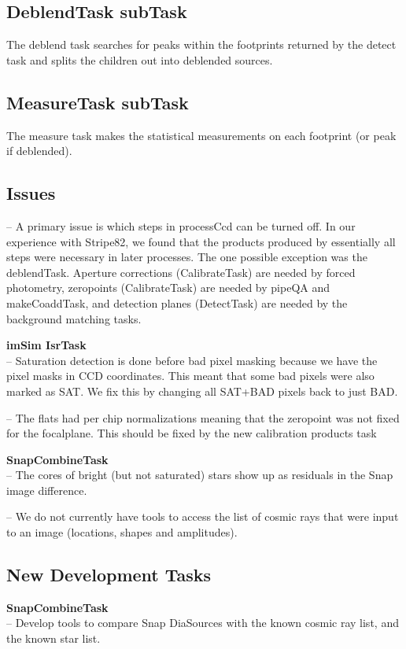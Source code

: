 \documentclass[12pt]{article}
\begin{document}
\subsection{DeblendTask subTask}
The deblend task searches for peaks within the footprints returned by the detect task and splits the children out into deblended sources.

\subsection{MeasureTask subTask}
The measure task makes the statistical measurements on each footprint (or peak if deblended).

\subsection{Issues}
-- A primary issue is which steps in processCcd can be turned off.  In our experience with Stripe82, we found that the products produced by
essentially all steps were necessary in later processes.  The one possible exception was the deblendTask.  Aperture corrections (CalibrateTask) 
are needed by forced photometry, zeropoints (CalibrateTask)
are needed by pipeQA and makeCoaddTask, and detection planes (DetectTask) are needed by the background matching tasks.

{\bf imSim IsrTask}\\
-- Saturation detection is done before bad pixel masking because we have the pixel masks in CCD coordinates.
This meant that some bad pixels were also marked as SAT.  We fix this by changing all SAT+BAD pixels back to just BAD.

-- The flats had per chip normalizations meaning that the zeropoint was not fixed for the focalplane.  This should be
fixed by the new calibration products task

{\bf SnapCombineTask}\\
-- The cores of bright (but not saturated) stars show up as residuals
in the Snap image difference.

-- We do not currently have tools to access the list of cosmic rays
that were input to an image (locations, shapes and amplitudes).

\subsection{New Development Tasks}

{\bf SnapCombineTask}\\
-- Develop tools to compare Snap DiaSources with the known cosmic ray
list, and the known star list.
\end{document}

